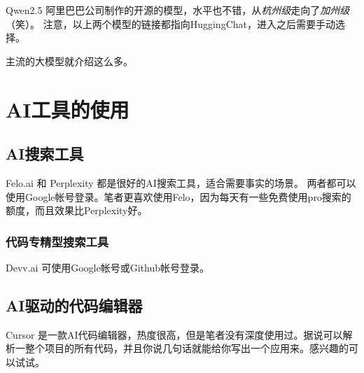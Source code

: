 \textsf{Qwen2.5} \href{https://huggingface.co/chat/}{\color{black}\faLink} 阿里巴巴公司制作的开源的模型，水平也不错，从\textit{杭州级}走向了\textit{加州级}（笑）。
注意，以上两个模型的链接都指向\textsf{HuggingChat}，进入之后需要手动选择。

主流的大模型就介绍这么多。




\section{AI工具的使用}

\subsection{AI搜索工具}

\textsf{Felo.ai} \href{https://felo.ai/search}{\color{black}\faLink} 
和 \textsf{Perplexity} \href{https://www.perplexity.ai}{\color{black}\faLink} 都是很好的AI搜索工具，适合需要事实的场景。
两者都可以使用\textsf{Google}帐号登录。笔者更喜欢使用\textsf{Felo}，因为每天有一些免费使用pro搜索的额度，而且效果比\textsf{Perplexity}好。

\subsubsection{代码专精型搜索工具}

\textsf{Devv.ai} \href{https://devv.ai}{\color{black}\faLink} 可使用\textsf{Google}帐号或\textsf{Github}帐号登录。

\subsection{AI驱动的代码编辑器}

\textsf{Cursor} \href{https://www.cursor.com}{\color{black}\faLink} 是一款AI代码编辑器，热度很高，但是笔者没有深度使用过。据说可以解析一整个项目的所有代码，并且你说几句话就能给你写出一个应用来。感兴趣的可以试试。

